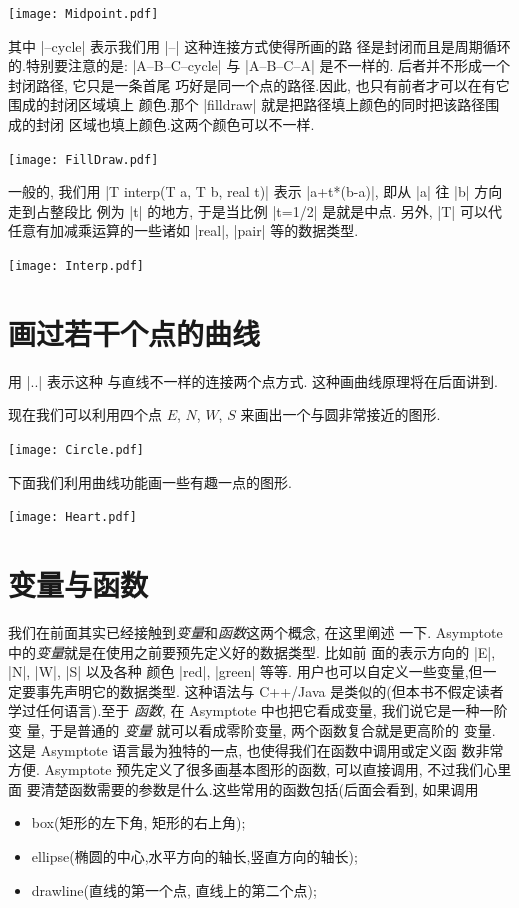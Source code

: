 \documentclass[nofonts,CJKnormalspaces]{ctexbook}[2009/05/20]
\begin{document}
\begin{center}\texttt{[image: Midpoint.pdf]}\end{center}%


其中 |--cycle| 表示我们用 |--| 这种连接方式使得所画的路
径是封闭而且是周期循环的.特别要注意的是: |A--B--C--cycle| 与
|A--B--C--A| 是不一样的. 后者并不形成一个封闭路径, 它只是一条首尾
巧好是同一个点的路径.因此, 也只有前者才可以在有它围成的封闭区域填上
颜色.那个 |filldraw| 就是把路径填上颜色的同时把该路径围成的封闭
区域也填上颜色.这两个颜色可以不一样.
\begin{center}\texttt{[image: FillDraw.pdf]}\end{center}%


一般的, 我们用 |T interp(T a, T b, real t)| 表示
|a+t*(b-a)|, 即从 |a| 往 |b| 方向走到占整段比
例为 |t| 的地方, 于是当比例 |t=1/2| 是就是中点. 另外,
|T| 可以代任意有加减乘运算的一些诸如 |real|,
|pair| 等的数据类型.
\begin{center}\texttt{[image: Interp.pdf]}\end{center}%


\section{画过若干个点的曲线}
用 |..| 表示这种
与直线不一样的连接两个点方式. 这种画曲线原理将在后面讲到.

现在我们可以利用四个点 $E$, $N$, $W$, $S$ 来画出一个与圆非常接近的图形.
\begin{center}\texttt{[image: Circle.pdf]}\end{center}%


下面我们利用曲线功能画一些有趣一点的图形.
\begin{center}\texttt{[image: Heart.pdf]}\end{center}%


\section{变量与函数}
我们在前面其实已经接触到\emph{变量}和\emph{函数}这两个概念, 在这里阐述
一下. Asymptote 中的\emph{变量}就是在使用之前要预先定义好的数据类型. 比如前
面的表示方向的 |E|, |N|, |W|, |S| 以及各种
颜色 |red|, |green| 等等. 用户也可以自定义一些变量,但一
定要事先声明它的数据类型. 这种语法与 C++/Java 是类似的(但本书不假定读者
学过任何语言).至于 \emph{函数}, 在 Asymptote 中也把它看成变量, 我们说它是一种一阶变
量, 于是普通的 \emph{变量} 就可以看成零阶变量, 两个函数复合就是更高阶的
变量. 这是 Asymptote 语言最为独特的一点, 也使得我们在函数中调用或定义函
数非常方便. Asymptote 预先定义了很多画基本图形的函数, 可以直接调用, 不过我们心里面
要清楚函数需要的参数是什么.这些常用的函数包括(后面会看到, 如果调用
\begin{itemize}
\item {box(矩形的左下角, 矩形的右上角);}
\item {ellipse(椭圆的中心,水平方向的轴长,竖直方向的轴长);}
\item {drawline(直线的第一个点, 直线上的第二个点);}
\end{itemize}
\end{document}
